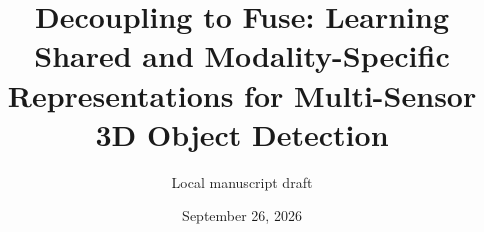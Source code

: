 \documentclass[11pt]{article}
\title{Decoupling to Fuse: Learning Shared and Modality-Specific Representations for Multi-Sensor 3D Object Detection}
\author{Local manuscript draft}
\date{September 26, 2026}
\begin{document}
\maketitle

\FloatBarrier

\FloatBarrier

\FloatBarrier

\FloatBarrier



\clearpage

\end{document}
